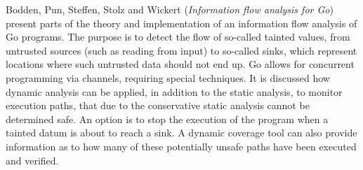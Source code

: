 

Bodden, Pun, Steffen, Stolz and Wickert
\cite{isola-2016-bodden}
({\em Information flow analysis for Go})
present parts of the theory and implementation of 
an information flow analysis of Go programs. The purpose is
to detect the flow of so-called tainted values, from untrusted sources (such as reading from input) to so-called sinks, 
which represent locations where such untrusted data should not end up.  Go allows for concurrent programming via channels, requiring
special techniques. It is discussed how dynamic analysis can be
applied, in addition to the  static analysis, to monitor execution paths, that due to the conservative static analysis cannot be determined safe. An option is to stop the execution of
the program when a tainted datum is about to reach a sink.
A dynamic coverage tool can also provide information
as to how many of these potentially unsafe paths have been executed and verified.
